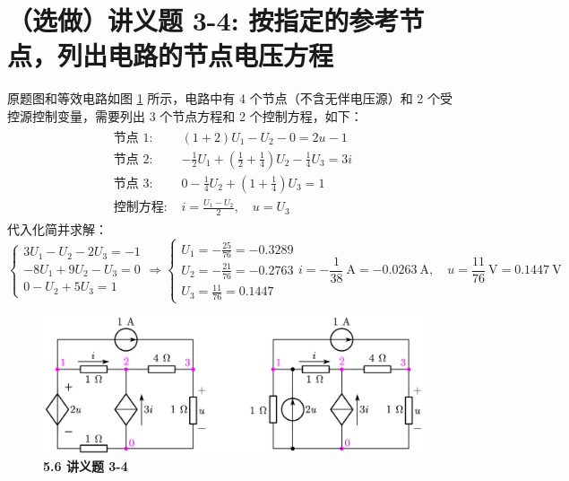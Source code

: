 \documentclass[UTF8]{report}
\theoremstyle{MyLineTheoremStyle} %
\theoremstyle{MyBlockTheoremStyle} %
\theoremstyle{MySubsubsectionStyle} %
\begin{document}
\section{（选做）讲义题 3-4: 按指定的参考节点，列出电路的节点电压方程}

原题图和等效电路如图 \ref{5.6 讲义题 3-4} 所示，电路中有 4 个节点（不含无伴电压源）和 2 个受控源控制变量，需要列出 3 个节点方程和 2 个控制方程，如下：
\begin{align}
\begin{matrix}
    \text{节点 1: } & (1 + 2)U_1 - U_2 - 0 = 2u-1\\
    \text{节点 2: } & -\frac{1}{2}U_1 + \left(\frac{1}{2} + \frac{1}{4}\right)U_2 - \frac{1}{4}U_3 = 3 i  \\
    \text{节点 3: } &  0-\frac{1}{4}U_2 + \left(1 + \frac{1}{4}\right)U_3 = 1 \\
    \text{控制方程: } & i = \frac{U_1 - U_2}{2},\quad u = U_3
\end{matrix}
\end{align}
代入化简并求解：
\begin{equation}
\begin{cases}
    3U_1 - U_2 -2 U_3 = -1\\ 
    -8U_1 + 9U_2 - U_3 = 0 \\ 
    0 - U_2 + 5U_3 = 1
\end{cases}\Longrightarrow 
\begin{cases}
    U_1 =  -\frac{25}{76}  = -0.3289 \\
    U_2 =  -\frac{21}{76}  = -0.2763 \\
    U_3 = \frac{11}{76}    = 0.1447  
\end{cases}
i = -\frac{1}{38}\ \mathrm{A} = -0.0263 \ \mathrm{A},\quad u = \frac{11}{76} \ \mathrm{V}= 0.1447 \ \mathrm{V}
\end{equation}

\begin{figure}[H]\centering
\includegraphics[width=0.8\columnwidth]{assets/5/5.6.png}
\caption{\bfseries 5.6 讲义题 3-4}\label{5.6 讲义题 3-4}
\end{figure}
\end{document}
